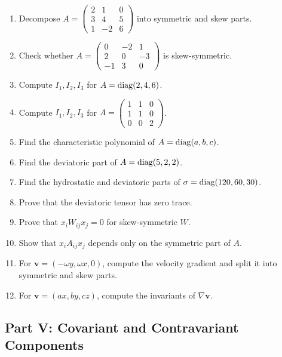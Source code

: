 \documentclass{otscience}
\begin{document}
\begin{practicebox}
\begin{enumerate}
\item Decompose \(A=\begin{pmatrix}2&1&0\\3&4&5\\1&-2&6\end{pmatrix}\) into symmetric and skew parts.
\item Check whether \(A=\begin{pmatrix}0&-2&1\\2&0&-3\\-1&3&0\end{pmatrix}\) is skew-symmetric.
\item Compute \(I_1,I_2,I_3\) for \(A=\operatorname{diag}(2,4,6)\).
\item Compute \(I_1,I_2,I_3\) for \(A=\begin{pmatrix}1&1&0\\1&1&0\\0&0&2\end{pmatrix}\).
\item Find the characteristic polynomial of \(A=\operatorname{diag}(a,b,c)\).
\item Find the deviatoric part of \(A=\operatorname{diag}(5,2,2)\).
\item Find the hydrostatic and deviatoric parts of \(\sigma=\operatorname{diag}(120,60,30)\).
\item Prove that the deviatoric tensor has zero trace.
\item Prove that \(x_{i}W_{ij}x_j=0\) for skew-symmetric \(W\).
\item Show that \(x_{i}A_{ij}x_j\) depends only on the symmetric part of \(A\).
\item For \(\mathbf{v}=(-\omega y,\omega x,0)\), compute the velocity gradient and split it into symmetric and skew parts.
\item For \(\mathbf{v}=(ax,by,cz)\), compute the invariants of \(\nabla\mathbf{v}\).
\end{enumerate}
\end{practicebox}

\subsection{Part V: Covariant and Contravariant Components}
\end{document}
